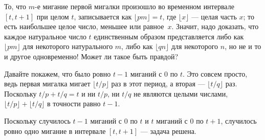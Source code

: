 То, что $m$-е мигание первой мигалки произошло во временном интервале $[t, t + 1]$ при целом $t$,
записывается как $\lfloor pm\rfloor = t$, где $\lfloor x\rfloor$ --- целая часть $x$; то есть наибольшее целое число, меньшее или равное~$x$.
Значит, надо доказать, что каждое натуральное число $t$ единственным образом представляется либо как $\lfloor pm\rfloor$ для некоторого натурального $m$, либо как $\lfloor qn\rfloor$ для некоторого $n$, но не и то и другое одновременно!
Может ли такое быть правдой?



Давайте покажем, что было ровно $t - 1$ миганий с $0$ по $t$.
Это совсем просто, ведь первая мигалка мигает $\lfloor t/p\rfloor$ раз в этот период, а вторая --- $\lfloor t/q\rfloor$ раз.
Поскольку $t/p + t/q = t$ и ни $t/p$, ни $t/q$ не являются целыми числами, $\lfloor t/p\rfloor + \lfloor t/q\rfloor$ в точности равно $t - 1$.

Поскольку случилось $t - 1$ миганий с $0$ по $t$ и $t$ миганий с $0$ по $t+1$, случилось ровно одно мигание в интервале $[t,t+1]$ --- задача решена.


%
%
%
%
%
%



